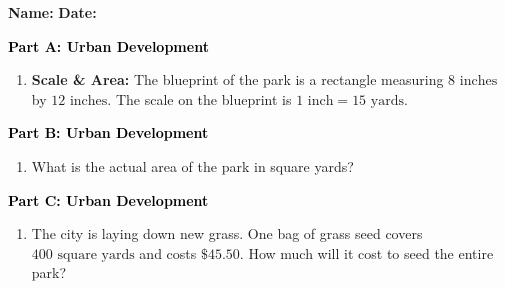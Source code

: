 \documentclass[12pt, letterpaper, fleqn]{article}
\begin{document}
\textbf{Name:} \underline{\hspace{5cm}}
\hfill
\textbf{Date:} \underline{\hspace{3cm}}\\

\begin{tcolorbox}[colback=customteal!20]
\large\textcolor{black}{\textbf{Part A: Urban Development}}
\end{tcolorbox}

\vspace{3mm}

\begin{enumerate}[itemsep=2.5cm, leftmargin=0.6cm]
\item \textbf{Scale \& Area:} The blueprint of the park is a rectangle measuring $8\text{ inches}$ by $12\text{ inches}$. The scale on the blueprint is $1\text{ inch} = 15\text{ yards}$. 
\end{enumerate}

\newpage

\begin{tcolorbox}[colback=customteal!20]
\large\textcolor{black}{\textbf{Part B: Urban Development}}
\end{tcolorbox}

\vspace{3mm}

\begin{enumerate}[itemsep=2.5cm, leftmargin=0.6cm, resume]
\item What is the actual area of the park in square yards?
\end{enumerate}

\newpage

\begin{tcolorbox}[colback=customteal!20]
\large\textcolor{black}{\textbf{Part C: Urban Development}}
\end{tcolorbox}

\vspace{3mm}

\begin{enumerate}[itemsep=2.5cm, leftmargin=0.6cm, resume]
\item The city is laying down new grass. One bag of grass seed covers $400\text{ square yards}$ and costs $\$45.50$. How much will it cost to seed the entire park?
\end{enumerate}
\end{document}
